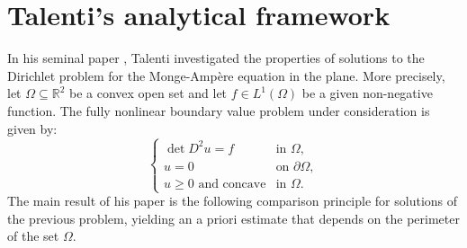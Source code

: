 \documentclass[10pt,a4paper]{amsart}
\numberwithin{equation}{section}
\begin{document}
\section{Talenti's analytical framework}

In his seminal paper \cite{talenti1981}, Talenti investigated the properties of solutions to the Dirichlet problem for the Monge-Ampère equation in the plane. More precisely, let $\Omega \subseteq \mathbb{R}^2$ be a convex open set and let $f\in L^1(\Omega)$ be a given non-negative function. The fully nonlinear boundary value problem under consideration is given by:
\begin{equation}\label{eq:dirichlet_ma}
\begin{cases} 
\det D^2u = f & \text{in } \Omega, \\ 
u = 0 & \text{on } \partial \Omega, \\
u \geq 0 \text{ and concave} & \text{in } \Omega.
\end{cases}
\end{equation}
\noindent The main result of his paper is the following comparison principle for solutions of the previous problem, yielding an a priori estimate that depends on the perimeter of the set $\Omega$. 
\end{document}

